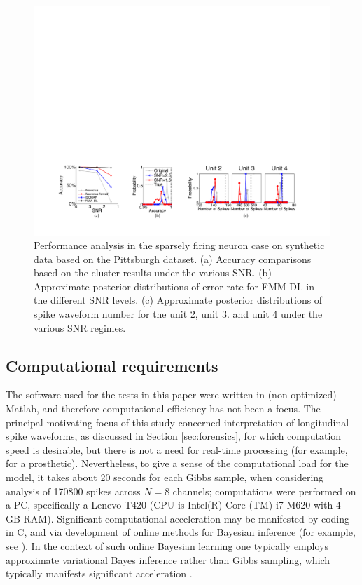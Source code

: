 \documentclass[journal]{IEEEtran}
\begin{document}
\begin{figure}[!htbp]
\centering
   \includegraphics[width=\textwidth] {figs_new/fig9.pdf}
  \caption{ {Performance analysis in the sparsely firing neuron case on synthetic data based on the Pittsburgh dataset. (a) Accuracy comparisons based on the cluster results under the various SNR. (b) Approximate posterior distributions of error rate for FMM-DL in the different SNR levels. (c) Approximate posterior distributions of spike waveform number for the unit 2, unit 3. and unit 4 under the various SNR regimes. 
   }} \label{fig:posterior_error_rate} \vspace{-10pt}
\end{figure}



\subsection{Computational requirements}

The software used for the tests in this paper were written in (non-optimized) Matlab, and therefore computational efficiency has not been a focus. The principal motivating focus of this study concerned interpretation of {longitudinal} spike waveforms, as discussed in Section \ref{sec:forensics}, for which computation speed is desirable, but there is not a need for real-time processing (for example, for a prosthetic).
 Nevertheless, to give a sense of the computational load for the model, it takes about 20 seconds for each Gibbs sample, when considering analysis of 170800 spikes across $N=8$ channels; computations were performed on a PC, specifically a Lenevo T420 (CPU is Intel(R) Core (TM) i7 M620 with 4 GB RAM). Significant computational acceleration may be manifested by coding in C, and via development of online methods for Bayesian inference (for example, see \cite{Wang11}). In the context of such online Bayesian learning one typically employs approximate variational Bayes inference rather than Gibbs sampling, which typically manifests significant acceleration \cite{Wang11}.
\end{document}
